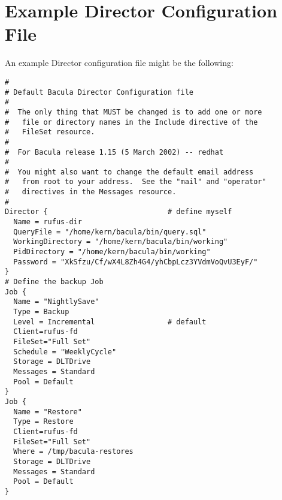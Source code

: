 \section{Example Director Configuration File}
\label{SampleDirectorConfiguration}

An example Director configuration file might be the following: 

\footnotesize
\begin{verbatim}
#
# Default Bacula Director Configuration file
#
#  The only thing that MUST be changed is to add one or more
#   file or directory names in the Include directive of the
#   FileSet resource.
#
#  For Bacula release 1.15 (5 March 2002) -- redhat
#
#  You might also want to change the default email address
#   from root to your address.  See the "mail" and "operator"
#   directives in the Messages resource.
#
Director {                            # define myself
  Name = rufus-dir
  QueryFile = "/home/kern/bacula/bin/query.sql"
  WorkingDirectory = "/home/kern/bacula/bin/working"
  PidDirectory = "/home/kern/bacula/bin/working"
  Password = "XkSfzu/Cf/wX4L8Zh4G4/yhCbpLcz3YVdmVoQvU3EyF/"
}
# Define the backup Job
Job {
  Name = "NightlySave"
  Type = Backup
  Level = Incremental                 # default
  Client=rufus-fd
  FileSet="Full Set"
  Schedule = "WeeklyCycle"
  Storage = DLTDrive
  Messages = Standard
  Pool = Default
}
Job {
  Name = "Restore"
  Type = Restore
  Client=rufus-fd
  FileSet="Full Set"
  Where = /tmp/bacula-restores
  Storage = DLTDrive
  Messages = Standard
  Pool = Default
}
   

\end{verbatim}
